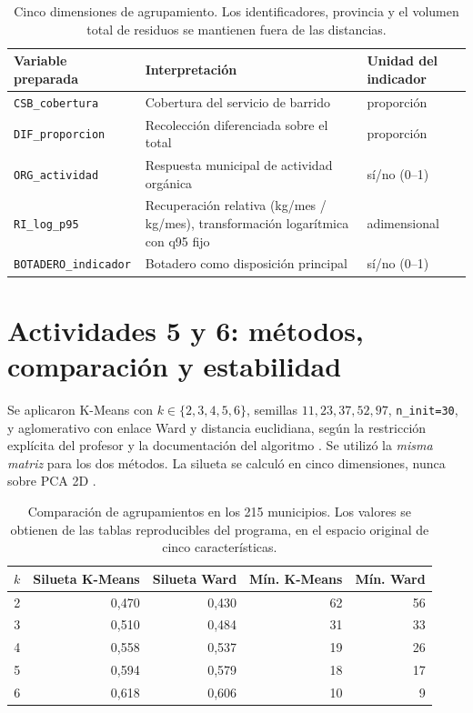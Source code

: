 \documentclass[10pt,a4paper]{article}
\begin{document}
\begin{table}[htbp]\centering\small
\begin{tabularx}{\linewidth}{@{}lXl@{}}\toprule
\textbf{Variable preparada}&\textbf{Interpretación} &\textbf{Unidad del indicador}\\\midrule
\texttt{CSB\_cobertura} & Cobertura del servicio de barrido & proporción\\
\texttt{DIF\_proporcion} & Recolección diferenciada sobre el total & proporción\\
\texttt{ORG\_actividad} & Respuesta municipal de actividad orgánica & sí/no (0--1)\\
\texttt{RI\_log\_p95} & Recuperación relativa (kg/mes / kg/mes), transformación logarítmica con q95 fijo & adimensional\\
\texttt{BOTADERO\_indicador} & Botadero como disposición principal & sí/no (0--1)\\\bottomrule
\end{tabularx}
\caption{Cinco dimensiones de agrupamiento. Los identificadores, provincia y el volumen total de residuos se mantienen fuera de las distancias.}\label{tab:variables}
\end{table}

\section{Actividades 5 y 6: métodos, comparación y estabilidad}
Se aplicaron K-Means con \(k\in\{2,3,4,5,6\}\), semillas \(11,23,37,52,97\), \texttt{n\_init=30}, y aglomerativo con enlace Ward y distancia euclidiana, según la restricción explícita del profesor y la documentación del algoritmo \parencite{sklearnWard}. Se utilizó la \emph{misma matriz} para los dos métodos. La silueta se calculó en cinco dimensiones, nunca sobre PCA 2D \parencite{sklearnSilhouette}.

\begin{table}[htbp]\centering\small
\begin{tabular}{@{}rrrrr@{}}\toprule
\(k\)&\textbf{Silueta K-Means}&\textbf{Silueta Ward}&\textbf{Mín. K-Means}&\textbf{Mín. Ward}\\\midrule
2 & 0,470 & 0,430 & 62 & 56\\
3 & 0,510 & 0,484 & 31 & 33\\
4 & 0,558 & 0,537 & 19 & 26\\
5 & 0,594 & 0,579 & 18 & 17\\
6 & 0,618 & 0,606 & 10 & 9\\\bottomrule
\end{tabular}
\caption{Comparación de agrupamientos en los 215 municipios. Los valores se obtienen de las tablas reproducibles del programa, en el espacio original de cinco características.}\label{tab:comparacion}
\end{table}
\end{document}
